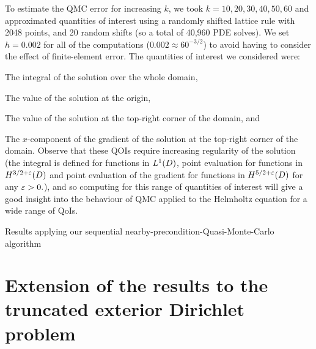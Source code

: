 To estimate the QMC error for increasing $k$, we took $k = 10,20,30,40,50,60$ and approximated quantities of interest using a randomly shifted lattice rule with 2048 points, and 20 random shifts (so a total of 40,960 PDE solves). We set $h = 0.002$ for all of the computations ($0.002 \approx 60^{-3/2}$) to avoid having to consider the effect of finite-element error. The quantities of interest we considered were:
\bit
\item The integral of the solution over the whole domain,
\item The value of the solution at the origin,
\item The value of the solution at the top-right corner of the domain, and
\item The $x$-component of the gradient of the solution at the top-right corner of the domain.
  \eit
  Observe that these QOIs require increasing regularity of the solution (the integral is defined for functions in $\LoD$, point evaluation for functions in $\Hfn{}{3/2 + \eps}{D}$ and point evaluation of the gradient for functions in $\Hfn{}{5/2+\eps}{D}$ for any $\varepsilon > 0.$), and so computing for this range of quantities of interest will give a good insight into the behaviour of QMC applied to the Helmholtz equation for a wide range of QoIs.

\begin{table}
  \centering
  
  \caption{Results applying our sequential nearby-precondition-Quasi-Monte-Carlo algorithm}\label{tab:nbpcqmcseq}
  \end{table}



    

    
\section{Extension of the results to the truncated exterior Dirichlet problem}\label{sec:TEDP}

